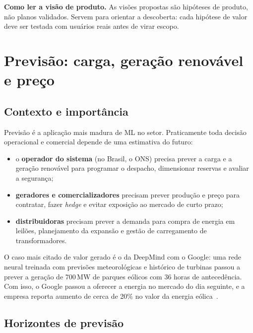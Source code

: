 \documentclass[10pt,a4paper,oneside]{article}
\begin{document}
\begin{nota}
\textbf{Como ler a visão de produto.} As visões propostas são hipóteses de
produto, não planos validados. Servem para orientar a descoberta: cada
hipótese de valor deve ser testada com usuários reais antes de virar escopo.
\end{nota}

\section{Previsão: carga, geração renovável e preço}

\subsection{Contexto e importância}

Previsão é a aplicação mais madura de ML no setor. Praticamente toda decisão
operacional e comercial depende de uma estimativa do futuro:

\begin{itemize}
  \item o \textbf{operador do sistema} (no Brasil, o ONS) precisa prever a carga
    e a geração renovável para programar o despacho, dimensionar reservas e
    avaliar a segurança;
  \item \textbf{geradores e comercializadores} precisam prever produção e preço
    para contratar, fazer \textit{hedge} e evitar exposição ao mercado de curto
    prazo;
  \item \textbf{distribuidoras} precisam prever a demanda para compra de energia
    em leilões, planejamento da expansão e gestão de carregamento de
    transformadores.
\end{itemize}

O caso mais citado de valor gerado é o da DeepMind com o Google: uma rede
neural treinada com previsões meteorológicas e histórico de turbinas passou
a prever a geração de 700\,MW de parques eólicos com 36 horas de
antecedência. Com isso, o Google passou a oferecer a energia no mercado
do dia seguinte, e a empresa reporta aumento de cerca de 20\% no valor da
energia eólica~\cite{deepmindwind}.

\subsection{Horizontes de previsão}
\end{document}
